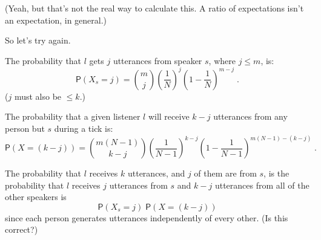 \documentclass[12pt]{article}
\newcommand{\pr}{\mathsf{P}} %
\newcommand{\comb}[2]{{{#1}\choose{#2}}}
\begin{document}
(Yeah, but that's not the real way to calculate this.  A ratio of
expectations isn't an expectation, in general.)

\vspace{3ex}

So let's try again.

The probability that $l$ gets $j$ utterances from speaker $s$,
where $j\leq m$, is:
\[
    \pr(X_s=j) = \comb{m}{j} \left(\frac{1}{N}\right)^j
    \left(1-\frac{1}{N}\right)^{m-j} \;.
\]
($j$ must also be $\leq k$.)

The probability that a given listener $l$ will receive $k-j$
utterances from any person but $s$ during a tick is:
\[
    \pr(X=(k-j)) = \comb{m(N-1)}{k-j}
    \left(\frac{1}{N-1}\right)^{k-j}
    \left(1-\frac{1}{N-1}\right)^{m(N-1)-(k-j)} \;.
\]

The probability that $l$ receives $k$ utterances, and $j$ of
them are from $s$, is the probability that $l$ receives $j$
utterances from $s$ and $k-j$ utterances from all of the other
speakers is 
\[
\pr(X_s=j) \; \pr(X=(k-j)) 
\]
since each person generates utterances independently of every
other. (Is this correct?)
\end{document}

